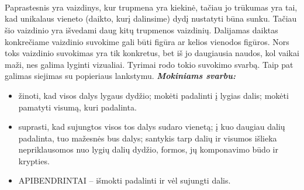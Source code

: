 \documentclass[a4paper]{article}
\begin{document}
\\ \\ \\ \\ \\ \\ \\ \\
Paprastesnis yra vaizdinys, kur trupmena yra kiekinė, tačiau jo trūkumas yra tai, kad unikalaus vieneto (daikto, kurį dalinsime) dydį nustatyti būna sunku. Tačiau šio vaizdinio yra išvedami daug kitų trupmenos vaizdinių. Dalijamas daiktas konkrečiame vaizdinio suvokime gali būti figūra ar kelios vienodos figūros. Nors toks vaizdinio suvokimas yra tik konkretus, bet iš jo daugiausia naudos, kol vaikai maži, nes galima lyginti vizualiai. Tyrimai rodo tokio suvokimo svarbą. Taip pat galimas siejimas su popieriaus lankstymu. \textbf{\textit{Mokiniams svarbu:}}
\begin{itemize}
\item žinoti, kad visos dalys lygaus dydžio; mokėti padalinti į lygias dalis; mokėti pamatyti visumą, kuri padalinta. 
\item suprasti, kad sujungtos visos tos dalys sudaro vienetą; į kuo daugiau dalių padalinta, tuo mažesnės bus dalys; santykis tarp dalių ir visumos išlieka nepriklausomos nuo lygių dalių dydžio, formos, jų komponavimo būdo ir krypties. 
\item APIBENDRINTAI – išmokti padalinti ir vėl sujungti dalis.
\end{itemize}
\end{document}
